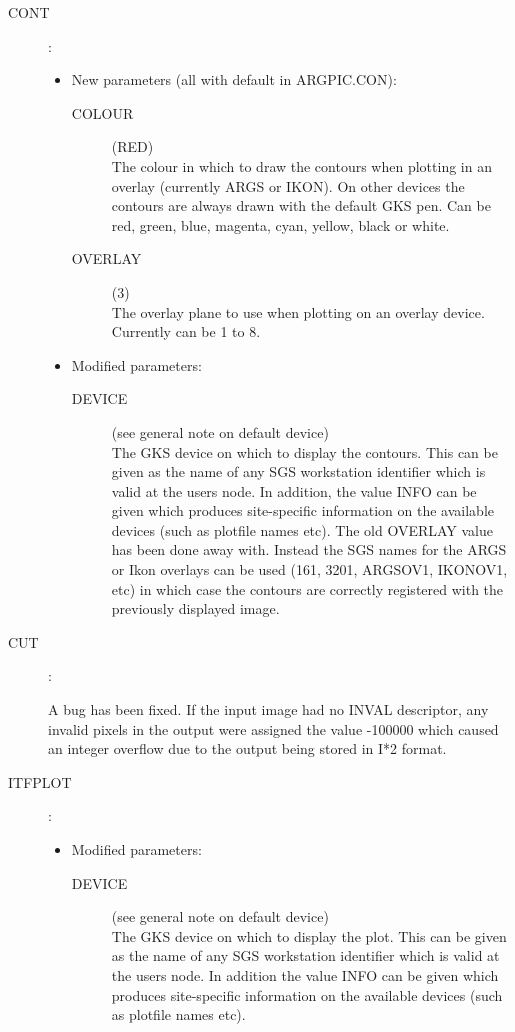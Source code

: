 \begin{description}
\item [CONT]:

\begin{itemize}
\item New parameters (all with default in ARGPIC.CON):
\begin{description}
\item [COLOUR](RED)\\
 The colour in which to draw the contours when plotting in an overlay
 (currently ARGS or IKON).
 On other devices the contours are always drawn with the default GKS pen.
 Can be red, green, blue, magenta, cyan, yellow, black or white.
\item [OVERLAY](3)\\
 The overlay plane to use when plotting on an overlay device.
 Currently can be 1 to 8.
\end{description}
\item Modified parameters:
\begin{description}
\item [DEVICE](see general note on default device)\\
 The GKS device on which to display the contours.
 This can be given as the name of any SGS workstation identifier which is valid
 at the users node.
 In addition, the value INFO can be given which produces site-specific
 information on the available devices (such as plotfile names etc).
 The old OVERLAY value has been done away with.
 Instead the SGS names for the ARGS or Ikon overlays can be used (161, 3201,
 ARGSOV1, IKONOV1, etc) in which case the contours are correctly registered
 with the previously displayed image.
\end{description}
\end{itemize}

\item [CUT]:

A bug has been fixed.
If the input image had no INVAL descriptor, any invalid pixels in the output
were assigned the value -100000 which caused an integer overflow due to the
output being stored in I*2 format.

\item [ITFPLOT]:

\begin{itemize}
\item Modified parameters:
\begin{description}
\item [DEVICE](see general note on default device)\\
 The GKS device on which to display the plot.
 This can be given as the name of any SGS workstation identifier which is valid
 at the users node.
 In addition the value INFO can be given which produces site-specific
 information on the available devices (such as plotfile names etc). 
\end{description}
\end{itemize}


\end{description}
